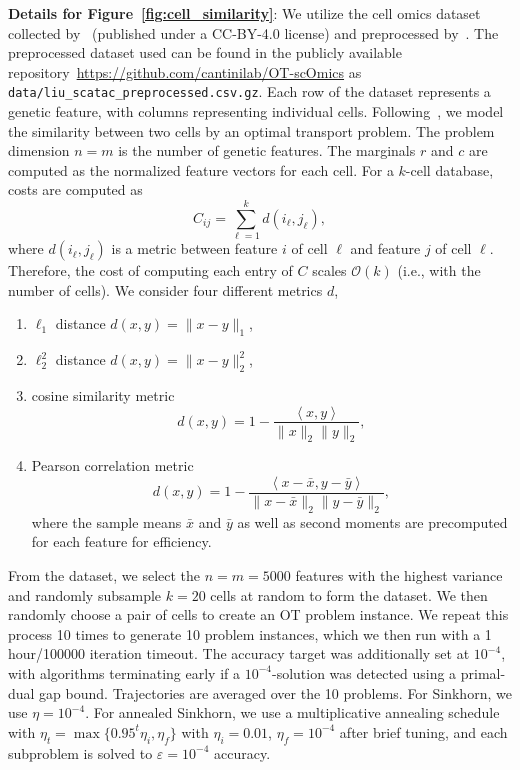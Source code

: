 \documentclass[10pt]{article}
\newcommand{\inner}[2]{\left\langle #1,#2\right\rangle}
\theoremstyle{plain}
\theoremstyle{definition}
\theoremstyle{remark}
\begin{document}
\vspace{1em}\noindent\textbf{Details for Figure~\ref{fig:cell_similarity}}: We utilize the cell omics dataset collected by~\cite{liu2019deconvolution} (published under a CC-BY-4.0 license) and preprocessed by~\cite{huizingOptimalTransportImproves2022}. The preprocessed dataset used can be found in the publicly available repository~\href{https://github.com/cantinilab/OT-scOmics}{https://github.com/cantinilab/OT-scOmics} as \texttt{data/liu\_scatac\_preprocessed.csv.gz}. Each row of the dataset represents a genetic feature, with columns representing individual cells. Following~\cite{huizingOptimalTransportImproves2022}, we model the similarity between two cells by an optimal transport problem. The problem dimension $n=m$ is the number of genetic features. The marginals $r$ and $c$ are computed as the normalized feature vectors for each cell. For a $k$-cell database, costs are computed as 
\begin{equation}
    C_{ij}=\sum_{\ell=1}^kd(i_\ell,j_\ell),
\end{equation}
where $d(i_\ell,j_\ell)$ is a metric between feature $i$ of cell $\ell$ and feature $j$ of cell $\ell$. Therefore, the cost of computing each entry of $C$ scales $\mathcal{O}(k)$ (i.e., with the number of cells). We consider four different metrics $d$, 
\begin{enumerate}
    \item $\ell_1$ distance $d(x,y)=\|x-y\|_1$,
    \item $\ell_2^2$ distance $d(x,y)=\|x-y\|_2^2$,
    \item cosine similarity metric
    \begin{equation*}
        d(x,y)=1-\frac{\inner{x}{y}}{\|x\|_2\|y\|_2},
    \end{equation*}
    \item Pearson correlation metric
    \begin{equation*}
        d(x,y)=1-\frac{\inner{x-\bar{x}}{y-\bar{y}}}{\|x-\bar x\|_2\|y-\bar y\|_2},
    \end{equation*}
    where the sample means $\bar x$ and $\bar y$ as well as second moments are precomputed for each feature for efficiency.
\end{enumerate}

From the dataset, we select the $n=m=5000$ features with the highest variance and randomly subsample $k=20$ cells at random to form the dataset. We then randomly choose a pair of cells to create an OT problem instance. We repeat this process 10 times to generate 10 problem instances, which we then run with a 1 hour/100000 iteration timeout. The accuracy target was additionally set at $10^{-4}$, with algorithms terminating early if a $10^{-4}$-solution was detected using a primal-dual gap bound. Trajectories are averaged over the 10 problems. For Sinkhorn, we use $\eta=10^{-4}$. For annealed Sinkhorn, we use a multiplicative annealing schedule with $\eta_t=\max\{0.95^t\eta_i,\eta_f\}$ with $\eta_i=0.01$, $\eta_f=10^{-4}$ after brief tuning, and each subproblem is solved to $\varepsilon=10^{-4}$ accuracy.
\end{document}
